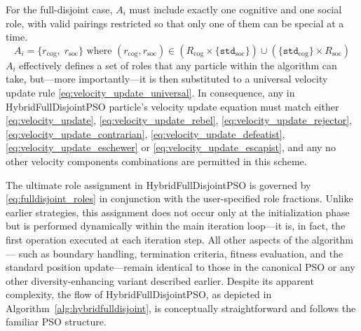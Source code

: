 {For the full-disjoint case, $A_i$  must include exactly one cognitive and one social role, with valid pairings restricted so that only one of them can be special at a time.
\begin{equation}\label{eq:fulldisjoint_roles}
    A_i = \{ r_\text{cog},\; r_\text{soc} \}\text{ where }(r_\text{cog}, r_\text{soc}) \in (R_\text{cog} \times \{\texttt{std}_\text{soc}\}) \cup (\{\texttt{std}_\text{cog}\} \times R_\text{soc}) 
\end{equation}
$A_i$ effectively defines a set of roles that any particle within the algorithm can take, but---more importantly---it is then substituted to a universal velocity update rule \eqref{eq:velocity_update_universal}.
In consequence, any in HybridFullDisjointPSO particle's velocity update equation must match either \eqref{eq:velocity_update}, \eqref{eq:velocity_update_rebel}, \eqref{eq:velocity_update_rejector}, \eqref{eq:velocity_update_contrarian}, \eqref{eq:velocity_update_defeatist}, \eqref{eq:velocity_update_eschewer} or \eqref{eq:velocity_update_escapist}, and any no other velocity components combinations are permitted in this scheme. 

The ultimate role assignment in HybridFullDisjointPSO is governed by \eqref{eq:fulldisjoint_roles} in conjunction with the user-specified role fractions. Unlike earlier strategies, this assignment does not occur only at the initialization phase but is performed dynamically within the main iteration loop---it is, in fact, the first operation executed at each iteration step.
All other aspects of the algorithm — such as boundary handling, termination criteria, fitness evaluation, and the standard position update---remain identical to those in the canonical PSO or any other diversity-enhancing variant described earlier.
Despite its apparent complexity, the flow of HybridFullDisjointPSO, as depicted in Algorithm~\ref{alg:hybridfulldisjoint}, is conceptually straightforward and follows the familiar PSO structure.

}
